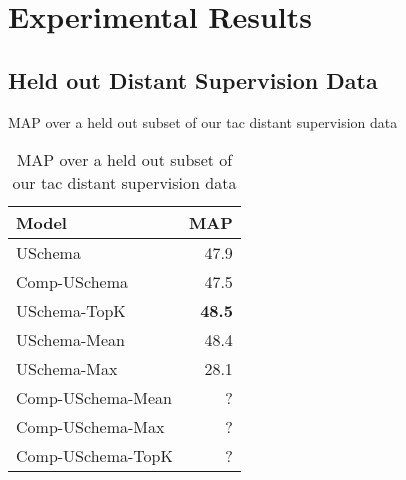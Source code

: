 \section{Experimental Results\label{sec:results}}


\subsection {Held out Distant Supervision Data}
MAP over a held out subset of our tac distant supervision data


\begin{table}[h!]
\setlength{\tabcolsep}{4.1pt}
\begin{center}
\begin{tabular}{|lr|}
\hline
\bf Model & MAP \\
\hline\hline
USchema              & 47.9 \\
Comp-USchema         & 47.5  \\
\hline\hline
USchema-TopK         & \bf48.5  \\
USchema-Mean         & 48.4 \\
USchema-Max          & 28.1  \\
Comp-USchema-Mean    & ?  \\
Comp-USchema-Max     & ? \\
Comp-USchema-TopK    & ?  \\
\hline

\hline
\end{tabular}
\caption{MAP over a held out subset of our tac distant supervision data
\label{distant-supervision-table}}
\end{center}
\vspace{-.3cm}
\end{table}
